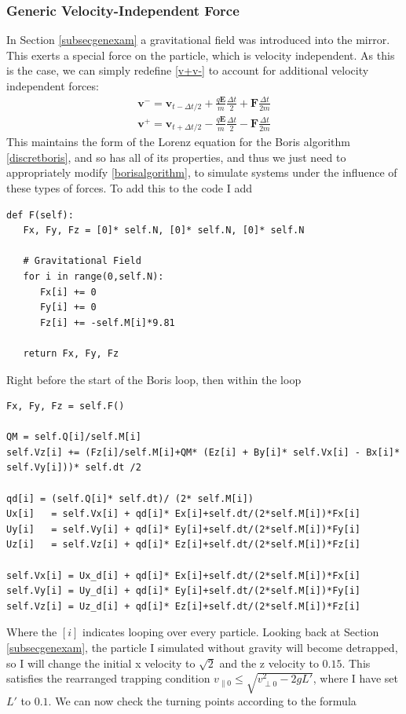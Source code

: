 \documentclass[12pt]{article}
\begin{document}
\subsubsection{Generic Velocity-Independent Force} 
In Section \ref{subsecgenexam} a gravitational field was introduced into the mirror. This exerts a special force on the particle, which is velocity independent. As this is the case, we can simply redefine \eqref{v+v-} to account for additional velocity independent forces:
\begin{equation}\label{v+v-gen}
\begin{split}
\textbf{v}^-=\textbf{v}_{t-\Delta t/2}+\frac{q\textbf{E}}{m}\frac{\Delta t}{2}+\textbf{F}\frac{\Delta t}{2m}\\
\textbf{v}^+=\textbf{v}_{t+\Delta t/2}-\frac{q\textbf{E}}{m}\frac{\Delta t}{2}-\textbf{F}\frac{\Delta t}{2m}
\end{split}
\end{equation}
This maintains the form of the Lorenz equation for the Boris algorithm \eqref{discretboris}, and so has all of its properties, and thus we just need to appropriately modify \eqref{borisalgorithm}, to simulate systems under the influence of these types of forces. To add this to the code I add
\begin{verbatim}
def F(self):
   Fx, Fy, Fz = [0]* self.N, [0]* self.N, [0]* self.N
        
   # Gravitational Field
   for i in range(0,self.N):
      Fx[i] += 0
      Fy[i] += 0
      Fz[i] += -self.M[i]*9.81
        
   return Fx, Fy, Fz
\end{verbatim}
Right before the start of the Boris loop, then within the loop
\begin{verbatim}
Fx, Fy, Fz = self.F()

QM = self.Q[i]/self.M[i]
self.Vz[i] += (Fz[i]/self.M[i]+QM* (Ez[i] + By[i]* self.Vx[i] - Bx[i]* self.Vy[i]))* self.dt /2

qd[i] = (self.Q[i]* self.dt)/ (2* self.M[i])
Ux[i]   = self.Vx[i] + qd[i]* Ex[i]+self.dt/(2*self.M[i])*Fx[i]
Uy[i]   = self.Vy[i] + qd[i]* Ey[i]+self.dt/(2*self.M[i])*Fy[i]
Uz[i]   = self.Vz[i] + qd[i]* Ez[i]+self.dt/(2*self.M[i])*Fz[i]

self.Vx[i] = Ux_d[i] + qd[i]* Ex[i]+self.dt/(2*self.M[i])*Fx[i]
self.Vy[i] = Uy_d[i] + qd[i]* Ey[i]+self.dt/(2*self.M[i])*Fy[i]
self.Vz[i] = Uz_d[i] + qd[i]* Ez[i]+self.dt/(2*self.M[i])*Fz[i]
\end{verbatim}
Where the $[i]$ indicates looping over every particle. Looking back at Section \ref{subsecgenexam}, the particle I simulated without gravity will become detrapped, so I will change the initial x velocity to $\sqrt{2}$ and the z velocity to $0.15$. This satisfies the rearranged trapping condition $v_{\parallel0}\leq\sqrt{v_{\perp0}^2-2gL'}$, where I have set $L'$ to $0.1$. We can now check the turning points according to the formula
\end{document}
